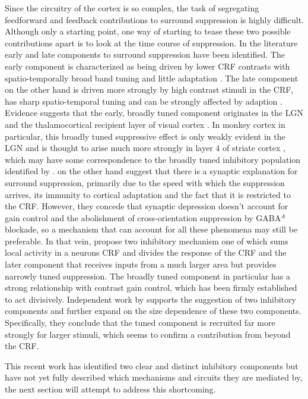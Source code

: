 Since the circuitry of the cortex is so complex, the task of
segregating feedforward and feedback contributions to surround
suppression is highly difficult. Although only a starting point, one
way of starting to tease these two possible contributions apart is to
look at the time course of suppression. In the literature early and
late components to surround suppression have been identified. The
early component is characterized as being driven by lower CRF
contrasts with spatio-temporally broad band tuning and little
adaptation \citep{Levitt1997,Cavanaugh2002a}. The late component on
the other hand is driven more strongly by high contrast stimuli in the
CRF, has sharp spatio-temporal tuning and can be strongly affected by
adaption \citep{Levitt1997}. Evidence suggests that the early, broadly
tuned component originates in the LGN and the thalamocortical
recipient layer of visual cortex \citep{Blasdel1984a,Hawken1996}. In
monkey cortex in particular, this broadly tuned suppressive effect is
only weakly evident in the LGN and is thought to arise much more
strongly in layer 4 of striate cortex \citep{Webb2005}, which may have
some correspondence to the broadly tuned inhibitory population
identified by \cite{Hirsch2003}. \cite{Carandini2002} on the other
hand suggest that there is a synaptic explanation for surround
suppression, primarily due to the speed with which the suppression
arrives, its immunity to cortical adaptation and the fact that it is
restricted to the CRF. However, they concede that synaptic depression
doesn't account for gain control and the abolishment of
cross-orientation suppression by GABA$^{A}$ blockade, so a mechanism
that can account for all these phenomena may still be preferable. In
that vein, \cite{Webb2005} propose two inhibitory mechanism one of
which sums local activity in a neurons CRF and divides the response of
the CRF and the later component that receives inputs from a much
larger area but provides narrowly tuned suppression. The broadly tuned
component in particular has a strong relationship with contrast gain
control, which has been firmly established to act
divisively. Independent work by \cite{Xing2005} supports the
suggestion of two inhibitory components and further expand on the size
dependence of these two components. Specifically, they conclude that
the tuned component is recruited far more strongly for larger stimuli,
which seems to confirm a contribution from beyond the CRF.

This recent work has identified two clear and distinct inhibitory
components but have not yet fully described which mechanisms and
circuits they are mediated by, the next section will attempt to
address this shortcoming.

